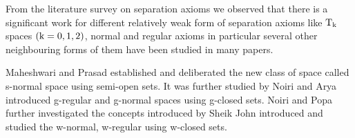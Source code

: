 From the literature survey on separation axioms we observed that there is a significant work for different relatively weak form of separation axioms like $\mathrm{T}_{\mathrm{k}}$ spaces $(\mathrm{k}=0, 1, 2)$, normal and regular axioms in particular several other neighbouring forms of them have been studied in many papers.

Maheshwari and Prasad \cite{Maheshwari} established and deliberated the new class of space called s-normal space using semi-open sets. It was further studied by Noiri \cite{Dontchev} and Arya \cite{Arya1} introduced g-regular and g-normal spaces using g-closed sets. Noiri and Popa \cite{Popa} further investigated the concepts introduced by Sheik John \cite{ShaikJohn} introduced and studied the w-normal, w-regular using w-closed sets.

